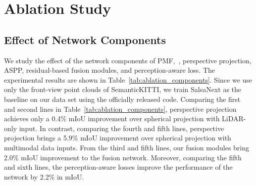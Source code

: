 \documentclass[10pt,twocolumn,letterpaper]{article}
\newcommand{\ice}[1]{{\color{black}#1}}
\begin{document}
\section{Ablation Study}



\begin{table}
\centering
\caption{Ablation study for the network components on the SemanticKITTI validation set. \textbf{PP} denotes perspective projection. \textbf{RF} denotes the residual-based fusion module. \textbf{PL} denotes perception-aware loss. The \textbf{bold} number is the best result.}
\vskip 0.15in


\label{tab:ablation_components}
\end{table}


\subsection{Effect of Network Components}
We study the effect of the network components of PMF,~\ie, perspective projection, ASPP, residual-based fusion modules, and perception-aware loss. The experimental results are shown in Table~\ref{tab:ablation_components}. Since we use only the front-view point clouds of SemanticKITTI, we train SalsaNext as the baseline on our data set using the officially released code. \ice{Comparing the first and second lines in Table~\ref{tab:ablation_components}, perspective projection achieves only a 0.4\% mIoU improvement over spherical projection with LiDAR-only input. In contrast, comparing the fourth and fifth lines, perspective projection brings a 5.9\% mIoU improvement over spherical projection with multimodal data inputs. From the third and fifth lines, our fusion modules bring 2.0\% mIoU improvement to the fusion network. Moreover, comparing the fifth and sixth lines, the perception-aware losses improve the performance of the network by 2.2\% in mIoU.}
\end{document}
